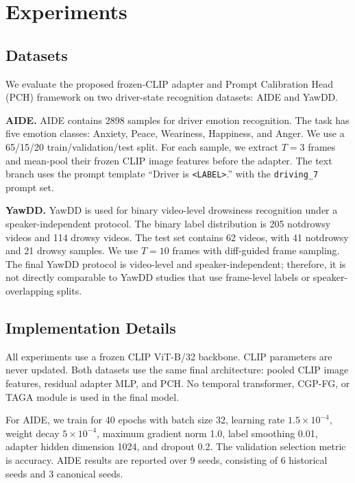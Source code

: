\section{Experiments}
\label{sec:experiments}

\subsection{Datasets}
\label{sec:datasets}

We evaluate the proposed frozen-CLIP adapter and Prompt Calibration Head (PCH) framework on two driver-state recognition datasets: AIDE and YawDD.

\textbf{AIDE.} AIDE contains 2898 samples for driver emotion recognition. The task has five emotion classes: Anxiety, Peace, Weariness, Happiness, and Anger. We use a 65/15/20 train/validation/test split. For each sample, we extract $T=3$ frames and mean-pool their frozen CLIP image features before the adapter. The text branch uses the prompt template ``Driver is \texttt{<LABEL>}.'' with the \texttt{driving\_7} prompt set.

\textbf{YawDD.} YawDD is used for binary video-level drowsiness recognition under a speaker-independent protocol. The binary label distribution is 205 notdrowsy videos and 114 drowsy videos. The test set contains 62 videos, with 41 notdrowsy and 21 drowsy samples. We use $T=10$ frames with diff-guided frame sampling. The final YawDD protocol is video-level and speaker-independent; therefore, it is not directly comparable to YawDD studies that use frame-level labels or speaker-overlapping splits.

\subsection{Implementation Details}
\label{sec:implementation_details}

All experiments use a frozen CLIP ViT-B/32 backbone. CLIP parameters are never updated. Both datasets use the same final architecture: pooled CLIP image features, residual adapter MLP, and PCH. No temporal transformer, CGP-FG, or TAGA module is used in the final model.

For AIDE, we train for 40 epochs with batch size 32, learning rate $1.5\times10^{-4}$, weight decay $5\times10^{-4}$, maximum gradient norm 1.0, label smoothing 0.01, adapter hidden dimension 1024, and dropout 0.2. The validation selection metric is accuracy. AIDE results are reported over 9 seeds, consisting of 6 historical seeds and 3 canonical seeds.

